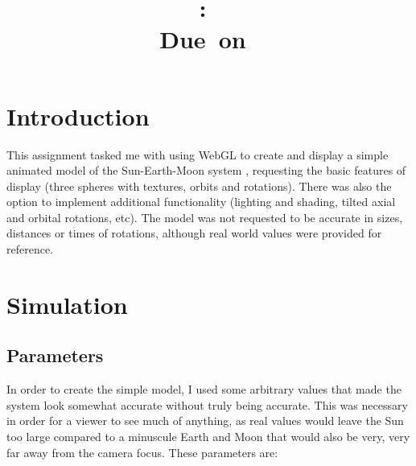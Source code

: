 \documentclass[12pt]{article}
\title{
\vspace{2in}
\textmd{\textbf{\hmwkClass:\ \hmwkTitle}}\\
\normalsize\vspace{0.1in}\small{Due\ on\ \hmwkDueDate}\\
\vspace{3in}
}
\author{\textbf{\hmwkAuthorName}}
\date{} %
\begin{document}
\maketitle



\newpage
\tableofcontents
\newpage



\section{Introduction}
This assignment tasked me with using WebGL to create and display a simple animated model of the Sun-Earth-Moon system \cite{assignment}, requesting the basic features of display (three spheres with textures, orbits and rotations). There was also the option to implement additional functionality (lighting and shading, tilted axial and orbital rotations, etc). The model was not requested to be accurate in sizes, distances or times of rotations, although real world values were provided for reference.

\section{Simulation}
\subsection{Parameters}
In order to create the simple model, I used some arbitrary values that made the system look somewhat accurate without truly being accurate. This was necessary in order for a viewer to see much of anything, as real values would leave the Sun too large compared to a minuscule Earth and Moon that would also be very, very far away from the camera focus. These parameters are:
\end{document}
